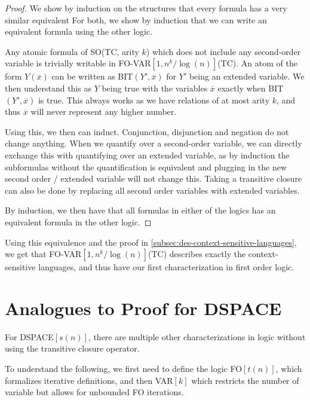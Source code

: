\begin{proof}
    We show by induction on the structures that every formula has a very similar equivalent
    For both, we show by induction that we can write an equivalent formula using the other logic.

    Any atomic formula of SO(TC, arity $k$) which does not include any second-order variable is trivially writable in FO-VAR$[1, n^k/\log(n)]$(TC).
    An atom of the form $Y(\overline{x})$ can be written as BIT$(Y', \overline{x})$ for $Y'$ being an extended variable.
    We then understand this as $Y$ being true with the variables $\overline{x}$ exactly when BIT$(Y', \overline{x})$ is true.
    This always works as we have relations of at most arity $k$, and thus $\overline{x}$ will never represent any higher number.

    Using this, we then can induct.
    Conjunction, disjunction and negation do not change anything.
    When we quantify over a second-order variable, we can directly exchange this with quantifying over an extended variable, as by induction the subformulas without the quantification is equivalent and plugging in the new second order / extended variable will not change this.
    Taking a transitive closure can also be done by replacing all second order variables with extended variables.

    By induction, we then have that all formulas in either of the logics has an equivalent formula in the other logic.
\end{proof}

Using this equivalence and the proof in \cref{subsec:des-context-sensitive-languages}, we get that FO-VAR$[1, n^k/\log(n)]$(TC) describes exactly the context-sensitive languages, and thus have our first characterization in first order logic.


\section{Analogues to Proof for DSPACE}\label{sec:analogues-to-proof-for-dspace}

For DSPACE$[s(n)]$, there are multiple other characterizations in logic without using the transitive closure operator.

To understand the following, we first need to define the logic FO$[t(n)]$, which formalizes iterative definitions, and then VAR$[k]$ which restricts the number of variable but allows for unbounded FO iterations.

